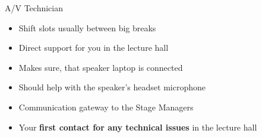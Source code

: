
\begin{frame}{A/V Technician}
	\begin{itemize}
		\item Shift slots usually between big breaks
		\item Direct support for you in the lecture hall
		\item Makes sure, that speaker laptop is connected
		\item Should help with the speaker's headset microphone
		\item Communication gateway to the Stage Managers
		\item Your \textbf{first contact for any technical issues} in the lecture hall
	\end{itemize}
\end{frame}
